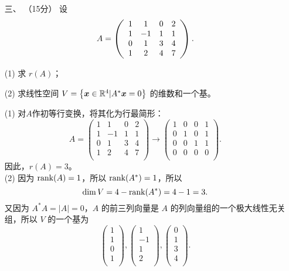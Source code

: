 \begin{enumerate}[1~]
\item[三、]（15分）
设
$$
A = \left( \begin{array} { c c c c } { 1 } & { 1 } & { 0 } & { 2 } \\ { 1 } & { - 1 } & { 1 } & { 1 } \\ { 0 } & { 1 } & { 3 } & { 4 } \\ { 1 } & { 2 } & { 4 } & { 7 } \end{array} \right).
$$

(1) 求 $r(A)$；

(2) 求线性空间 $V = \left\{ \boldsymbol{x} \in \mathbb{R} ^ { 4 } | A ^ { * } \boldsymbol{x} = 0 \right\}$ 的维数和一个基。

\begin{solution}
(1) 对$A$作初等行变换，将其化为行最简形：\[
A=\left( \begin{matrix}
	1&		1&		0&		2\\
	1&		-1&		1&		1\\
	0&		1&		3&		4\\
	1&		2&		4&		7\\
\end{matrix} \right) \rightarrow \left( \begin{matrix}
	1&		0&		0&		1\\
	0&		1&		0&		1\\
	0&		0&		1&		1\\
	0&		0&		0&		0\\
\end{matrix} \right) .
\]
因此，${r}(A)=3$。\\
(2) 因为 ${\rm rank}(A)=1$，所以 ${\rm rank}(A^*)=1$，所以\[
\dim V=4-{\rm rank}(A^*)=4-1=3.
\]
又因为 $A^* A = |A| =0$，$A$ 的前三列向量是 $A$ 的列向量组的一个极大线性无关组，所以 $V$ 的一个基为\[
\left( \begin{array}{c}
	1\\
	1\\
	0\\
	1\\
\end{array} \right) ,\left( \begin{array}{c}
	1\\
	-1\\
	1\\
	2\\
\end{array} \right) ,\left( \begin{array}{c}
	0\\
	1\\
	3\\
	4\\
\end{array} \right) .
\]
\end{solution}


\end{enumerate}
